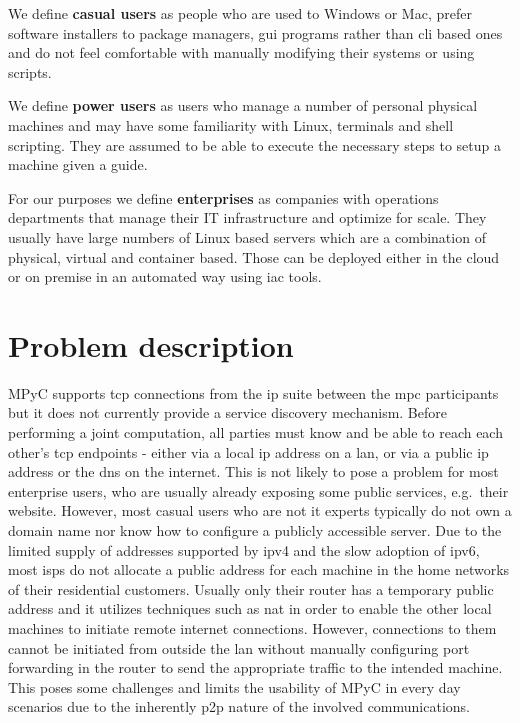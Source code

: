 We define \textbf{casual users} as people who are used to Windows or
Mac, prefer software installers to package managers, \gls{gui} programs
rather than \gls{cli} based ones and do not feel comfortable with
manually modifying their systems or using scripts.

We define \textbf{power users} as users who manage a number of personal
physical machines and may have some familiarity with Linux, terminals
and shell scripting. They are assumed to be able to execute the
necessary steps to setup a machine given a guide.

For our purposes we define \textbf{enterprises} as companies with
operations departments that manage their IT infrastructure and optimize
for scale. They usually have large numbers of Linux based servers which
are a combination of physical, virtual and container based. Those can be
deployed either in the cloud or on premise in an automated way using
\gls{iac} tools.

\hypertarget{problem-description}{%
\section{Problem description}\label{problem-description}}

MPyC supports \gls{tcp} connections from the \gls{ip} suite between the
\gls{mpc} participants but it does not currently provide a service
discovery mechanism. Before performing a joint computation, all parties
must know and be able to reach each other's \gls{tcp} endpoints - either
via a local \gls{ip} address on a \gls{lan}, or via a public \gls{ip}
address or the \gls{dns} on the internet. This is not likely to pose a
problem for most enterprise users, who are usually already exposing some
public services, e.g.~their website. However, most casual users who are
not \gls{it} experts typically do not own a domain name nor know how to
configure a publicly accessible server. Due to the limited supply of
addresses supported by \gls{ip}v4 and the slow adoption of \gls{ip}v6,
most \glspl{isp} do not allocate a public address for each machine in
the home networks of their residential customers. Usually only their
router has a temporary public address and it utilizes techniques such as
\gls{nat} in order to enable the other local machines to initiate remote
internet connections. However, connections to them cannot be initiated
from outside the \gls{lan} without manually configuring port forwarding
in the router to send the appropriate traffic to the intended machine.
This poses some challenges and limits the usability of MPyC in every day
scenarios due to the inherently \gls{p2p} nature of the involved
communications.

